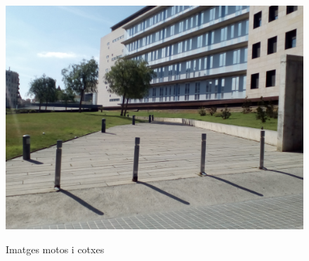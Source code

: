 \begin{figure}[!htb]
				\label{fig:awesome_image3}
			\endminipage\hfill
				\includegraphics[width=\linewidth]{images/experiments/uni4}
				\label{fig:awesome_image3}
			\endminipage
			\caption{Imatges motos i cotxes}
		\end{figure}

